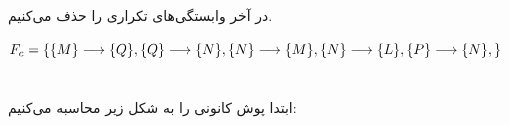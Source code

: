 \documentclass{article}
\begin{document}
در آخر وابستگی‌های تکراری را حذف می‌کنیم.
\begin{latin}
$
\\F_{c}=\\
\{\\
	\{M\}\longrightarrow\{Q\},\\
	\{Q\}\longrightarrow\{N\},\\
	\{N\}\longrightarrow\{M\},\\
	\{N\}\longrightarrow\{L\},\\
	\{P\}\longrightarrow\{N\},\\
\}
$
\end{latin}


\section{}%
ابتدا پوش کانونی را به شکل زیر محاسبه می‌کنیم:
\end{document}
